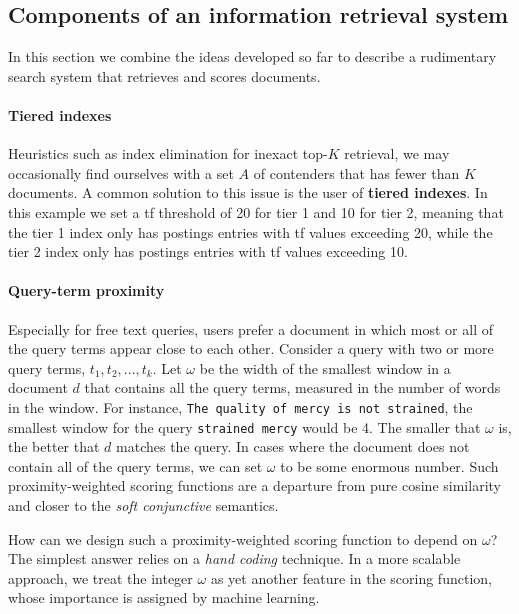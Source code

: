 \documentclass[letterpaper,11pt]{article}
\newcommand{\code}[1]{\texttt{#1}}
\begin{document}
\subsection{Components of an information retrieval system}
In this section we combine the ideas developed so far to describe a rudimentary search system that retrieves and scores documents.

\paragraph{Tiered indexes}
Heuristics such as index elimination for inexact top-$K$ retrieval, we may occasionally find ourselves with a set $A$ of contenders that has fewer than $K$ documents. A common solution to this issue is the user of \textbf{tiered indexes}. In this example we set a tf threshold of 20 for tier 1 and 10 for tier 2, meaning that the tier 1 index only has postings entries with tf values exceeding 20, while the tier 2 index only has postings entries with tf values exceeding 10.

\paragraph{Query-term proximity}
Especially for free text queries, users prefer a document in which most or all of the query terms appear close to each other. Consider a query with two or more query terms, $t_1, t_2, \dots , t_k$. Let $\omega$ be the width of the smallest window in a document $d$ that contains all the query terms, measured in the number of words in the window. For instance, \code{The quality of mercy is not strained}, the smallest window for the query \code{strained mercy} would be 4. The smaller that $\omega$ is, the better that $d$ matches the query. In cases where the document does not contain all of the query terms, we can set $\omega$ to be some enormous number. Such proximity-weighted scoring functions are a departure from pure cosine similarity and closer to the \textit{soft conjunctive} semantics.

How can we design such a proximity-weighted scoring function to depend on $\omega$? The simplest answer relies on a \textit{hand coding} technique. In a more scalable approach, we treat the integer $\omega$ as yet another feature in the scoring function, whose importance is assigned by machine learning.
\end{document}
